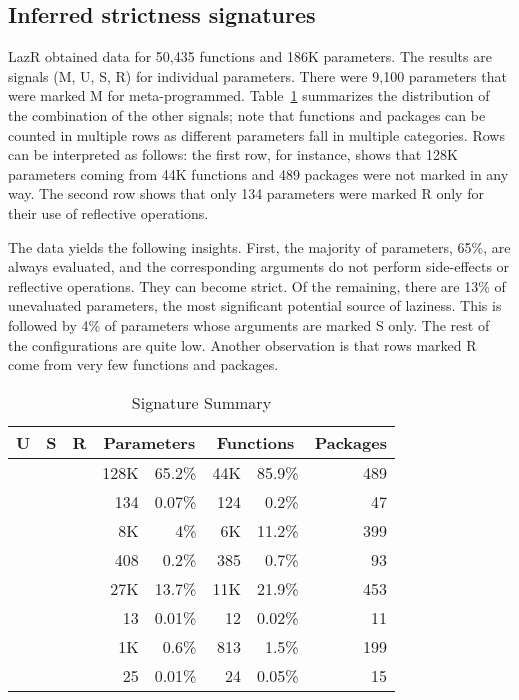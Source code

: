 \documentclass[review,nonacm,screen,acmsmall,anonymous=true]{acmart}
\newcommand{\xmark}{\textcolor{red}{\ding{55}}}
\newcommand{\cmark}{\textcolor{green}{\ding{51}}}
\newcommand{\lazr}{{\sf LazR}\xspace}
\begin{document}
\subsection{Inferred strictness signatures}\label{sec:results}

\lazr obtained data for 50,435 functions and 186K parameters. The results are
signals (M, U, S, R) for individual parameters. There were 9,100 parameters that
were marked M for meta-programmed. Table~\ref{table:strictdist} summarizes the
distribution of the combination of the other signals; note that functions and
packages can be counted in multiple rows as different parameters fall in
multiple categories. Rows can be interpreted as follows: the first row, for
instance, shows that 128K parameters coming from 44K functions and 489 packages
were not marked in any way. The second row shows that only 134 parameters
were marked R only for their use of reflective operations.

The data yields the following insights. First, the majority of parameters, 65\%,
are always evaluated, and the corresponding arguments do not perform
side-effects or reflective operations. They can become strict. Of the remaining,
there are 13\% of unevaluated parameters, the most significant potential source of
laziness. This is followed by 4\% of parameters whose arguments are marked S
only. The rest of the configurations are quite low. Another observation is that
rows marked R come from very few functions and packages.

\begin{table}
  \vspace{-3mm}
  \small
  \caption{Signature Summary} \label{table:strictdist}
  \centering
  \begin{tabular}{cccrrrrr}
    \toprule
    \bf U & \bf S & \bf R & \multicolumn{2}{c}{\textbf{Parameters}} & \multicolumn{2}{c}{\textbf{Functions}}& \bf Packages\\
    \midrule
    \xmark{}&\xmark{}&\xmark{}&128K &65.2\%&44K  &85.9\%&489\\
    \xmark{}&\xmark{}&\cmark{}&134  &0.07\%&124  &0.2\%&47\\
    \xmark{}&\cmark{}&\xmark{}&8K   &4\%&6K      &11.2\%&399\\
    \xmark{}&\cmark{}&\cmark{}&408  &0.2\%&385   &0.7\%&93\\
    \cmark{}&\xmark{}&\xmark{}&27K  &13.7\%&11K  &21.9\%&453\\
    \cmark{}&\xmark{}&\cmark{}&13   &0.01\%&12   &0.02\%&11\\
    \cmark{}&\cmark{}&\xmark{}&1K   &0.6\%&813   &1.5\%&199\\
    \cmark{}&\cmark{}&\cmark{}&25   &0.01\%&24   &0.05\%&15\\
    \bottomrule
  \end{tabular}
\end{table}
\end{document}
